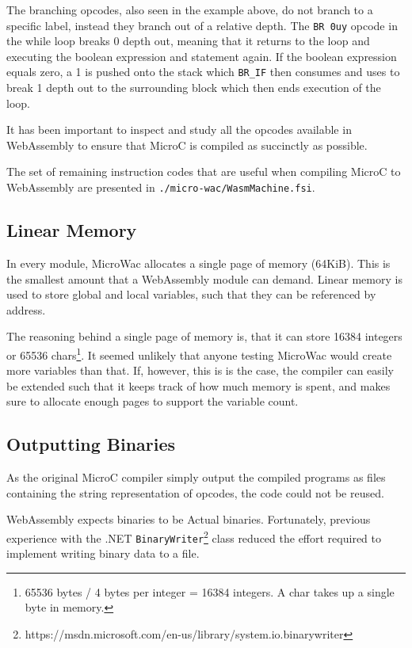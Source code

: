 \documentclass[a4paper]{article}
\begin{document}
The branching opcodes, also seen in the example above, do not branch to a specific label, instead they branch out of a relative depth. The \texttt{BR 0uy} opcode in the while loop breaks 0 depth out, meaning that it returns to the loop and executing the boolean expression and statement again. If the boolean expression equals zero, a 1 is pushed onto the stack which \texttt{BR\_IF} then consumes and uses to break 1 depth out to the surrounding block which then ends execution of the loop.

It has been important to inspect and study all the opcodes available in WebAssembly to ensure that MicroC is compiled as succinctly as possible.

The set of remaining instruction codes that are useful when compiling MicroC to WebAssembly are presented in \texttt{./micro-wac/WasmMachine.fsi}.

\subsection{Linear Memory}
\label{sec:technical:webassembly:memory}
In every module, MicroWac allocates a single page of memory (64KiB). This is the smallest amount that a WebAssembly module can demand. Linear memory is used to store global and local variables, such that they can be referenced by address.

The reasoning behind a single page of memory is, that it can store 16384 integers or 65536 chars\footnote{65536 bytes / 4 bytes per integer = 16384 integers. A char takes up a single byte in memory.}. It seemed unlikely that anyone testing MicroWac would create more variables than that. If, however, this is is the case, the compiler can easily be extended such that it keeps track of how much memory is spent, and makes sure to allocate enough pages to support the variable count.

\subsection{Outputting Binaries}
As the original MicroC compiler simply output the compiled programs as files containing the string representation of opcodes, the code could not be reused.

WebAssembly expects binaries to be Actual binaries. Fortunately, previous experience with the .NET \texttt{BinaryWriter}\footnote{https://msdn.microsoft.com/en-us/library/system.io.binarywriter} class reduced the effort required to implement writing binary data to a file.
\end{document}
